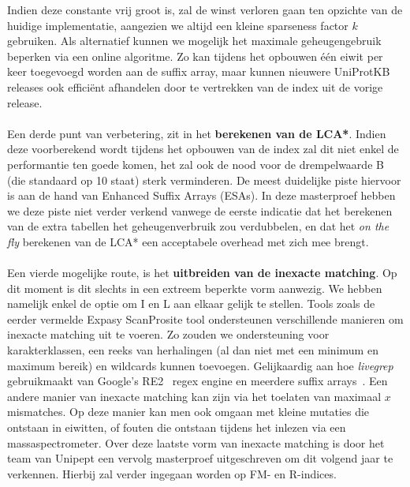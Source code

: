 Indien deze constante vrij groot is, zal de winst verloren gaan ten opzichte van de huidige implementatie, aangezien we altijd een kleine sparseness factor $k$ gebruiken.
Als alternatief kunnen we mogelijk het maximale geheugengebruik beperken via een online algoritme.
Zo kan tijdens het opbouwen één eiwit per keer toegevoegd worden aan de suffix array, maar kunnen nieuwere UniProtKB releases ook efficiënt afhandelen door te vertrekken van de index uit de vorige release.
\\ \\
Een derde punt van verbetering, zit in het \textbf{berekenen van de LCA*}.
Indien deze voorberekend wordt tijdens het opbouwen van de index zal dit niet enkel de performantie ten goede komen, het zal ook de nood voor de drempelwaarde B (die standaard op 10 staat) sterk verminderen.
De meest duidelijke piste hiervoor is aan de hand van Enhanced Suffix Arrays (ESAs).
In deze masterproef hebben we deze piste niet verder verkend vanwege de eerste indicatie dat het berekenen van de extra tabellen het geheugenverbruik zou verdubbelen, en dat het \textit{on the fly} berekenen van de LCA* een acceptabele overhead met zich mee brengt.
\\ \\
Een vierde mogelijke route, is het \textbf{uitbreiden van de inexacte matching}.
Op dit moment is dit slechts in een extreem beperkte vorm aanwezig.
We hebben namelijk enkel de optie om I en L aan elkaar gelijk te stellen.
Tools zoals de eerder vermelde Expasy ScanProsite tool ondersteunen verschillende manieren om inexacte matching uit te voeren.
Zo zouden we ondersteuning voor karakterklassen, een reeks van herhalingen (al dan niet met een minimum en maximum bereik) en wildcards kunnen toevoegen.
Gelijkaardig aan hoe \textit{livegrep}~\cite{livegrep} gebruikmaakt van Google's RE2~\cite{re2} regex engine en meerdere suffix arrays~\cite{regex_sa}.
Een andere manier van inexacte matching kan zijn via het toelaten van maximaal $x$ mismatches.
Op deze manier kan men ook omgaan met kleine mutaties die ontstaan in eiwitten, of fouten die ontstaan tijdens het inlezen via een massaspectrometer.
Over deze laatste vorm van inexacte matching is door het team van Unipept een vervolg masterproef uitgeschreven om dit volgend jaar te verkennen.
Hierbij zal verder ingegaan worden op FM- en R-indices.